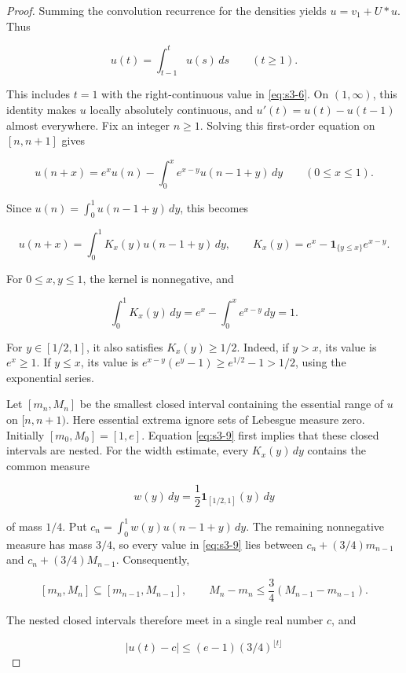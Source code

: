 \documentclass[10pt]{article}
\numberwithin{equation}{section}
\theoremstyle{remark}
\begin{document}
\begin{proof} Summing the convolution recurrence for the densities yields
\(u=v_1+U*u\). Thus

\begin{equation}
u(t)=\int_{t-1}^t u(s)\,ds\qquad(t\ge1).
\label{eq:s3-8}
\end{equation}

This includes \(t=1\) with the right-continuous value in \eqref{eq:s3-6}. On
\((1,\infty)\), this identity makes \(u\) locally absolutely continuous,
and \(u'(t)=u(t)-u(t-1)\) almost everywhere. Fix an integer \(n\ge1\).
Solving this first-order equation on \([n,n+1]\) gives

\[
u(n+x)=e^xu(n)-\int_0^x e^{x-y}u(n-1+y)\,dy
\qquad(0\le x\le1).
\]

Since \(u(n)=\int_0^1u(n-1+y)\,dy\), this becomes

\begin{equation}
u(n+x)=\int_0^1K_x(y)u(n-1+y)\,dy,
\qquad
K_x(y)=e^x-\mathbf1_{\{y\le x\}}e^{x-y}.
\label{eq:s3-9}
\end{equation}

For \(0\le x,y\le1\), the kernel is nonnegative, and

\[
\int_0^1 K_x(y)\,dy=e^x-\int_0^x e^{x-y}\,dy=1.
\]

For \(y\in[1/2,1]\), it also satisfies \(K_x(y)\ge1/2\). Indeed, if
\(y>x\), its value is \(e^x\ge1\). If \(y\le x\), its value is
\(e^{x-y}(e^y-1)\ge e^{1/2}-1>1/2\), using the exponential series.

Let \([m_n,M_n]\) be the smallest closed interval containing the essential
range of \(u\) on \([n,n+1)\). Here essential extrema ignore sets of
Lebesgue measure zero. Initially \([m_0,M_0]=[1,e]\). Equation \eqref{eq:s3-9} first
implies that these closed intervals are nested. For the width estimate,
every \(K_x(y)\,dy\) contains the common measure

\[
w(y)\,dy=\frac12\mathbf1_{[1/2,1]}(y)\,dy
\]

of mass \(1/4\). Put
\(c_n=\int_0^1w(y)u(n-1+y)\,dy\). The remaining nonnegative measure
has mass \(3/4\), so every value in \eqref{eq:s3-9} lies between
\(c_n+(3/4)m_{n-1}\) and \(c_n+(3/4)M_{n-1}\). Consequently,

\[
[m_n,M_n]\subseteq[m_{n-1},M_{n-1}],
\qquad M_n-m_n\le\frac34(M_{n-1}-m_{n-1}).
\]

The nested closed intervals therefore meet in a single real number \(c\),
and

\begin{equation}
|u(t)-c|\le(e-1)(3/4)^{\lfloor t\rfloor}
\label{eq:s3-10}
\end{equation}


\end{proof}
\end{document}
